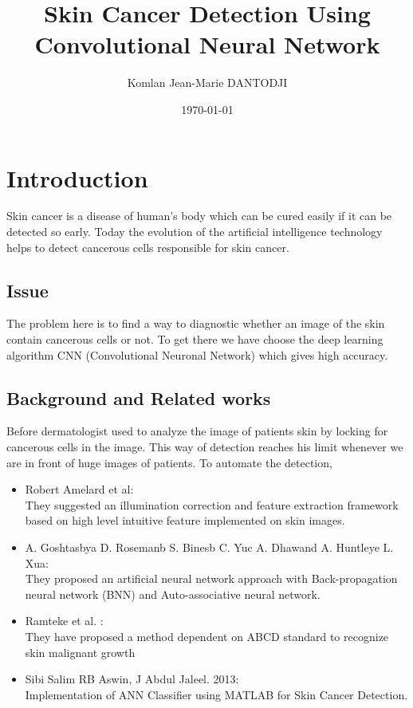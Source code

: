 \documentclass[12pt, letterpaper]{article}
\title{Skin Cancer Detection Using Convolutional Neural Network}
\author{Komlan Jean-Marie DANTODJI
\\
    \multicolumn{1}{
        p{.7\textwidth}}{\centering\emph{Université Paris Vincennes St-Denis\\
  M1 Big Data\\}
  }
}
\date{\today}
\begin{document}
\begin{titlepage}
    \maketitle
\end{titlepage}

\tableofcontents

\newpage
\section{Introduction}
\par Skin cancer is a disease of human’s body which can be cured easily if it can be detected so early. Today the evolution of the artificial intelligence technology helps to detect cancerous cells responsible for skin cancer. \\
\subsection{Issue}
\par The problem here is to find a way to diagnostic whether an image of the skin contain cancerous cells or not. To get there we have choose the deep learning algorithm CNN (Convolutional Neuronal Network) which gives high accuracy. 
\subsection{Background and Related works}
\par Before dermatologist used to analyze the image of patients skin by locking for cancerous cells in the image. This way of detection reaches his limit whenever we are in front of huge images of patients. To automate the detection, \\
\begin{itemize}
		\item Robert Amelard et al:\\
		They suggested an illumination correction and feature extraction framework based on high level intuitive feature implemented on skin images.
		\item A. Goshtasbya D. Rosemanb S. Binesb C. Yuc A. Dhawand A. Huntleye L. Xua:\\
		They proposed an artificial neural network approach with Back-propagation neural network (BNN) and Auto-associative neural network.
		\item Ramteke et al. : \\
		They have proposed a method dependent on ABCD standard to recognize skin malignant growth
		\item Sibi Salim RB Aswin, J Abdul Jaleel. 2013: \\
		Implementation of ANN Classifier using MATLAB for Skin Cancer Detection.
\end{itemize}
\end{document}
